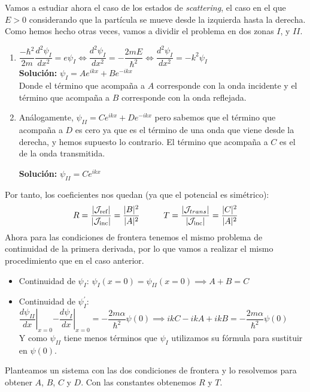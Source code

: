 \documentclass{report}
\begin{document}
            \noindent Vamos a estudiar ahora el caso de los estados de \textit{scattering},
            el caso en el que $E>0$ considerando que la partícula se mueve desde la 
            izquierda hasta la derecha. Como hemos hecho otras veces, vamos a dividir el
            problema en dos zonas $I$, y $II$.
            \begin{enumerate}
              \item $\dfrac{-\hbar^2}{2m}\dfrac{d^2\psi_I}{dx^2}=e\psi_I\Leftrightarrow 
                    \dfrac{d^2\psi_I}{dx^2}=-\dfrac{2mE}{\hbar^2}\Longleftrightarrow
                    \dfrac{d^2\psi_I}{dx^2}=-k^2\psi_I$\\

                    \textbf{Solución: } $\psi_I=Ae^{ikx}+Be^{-ikx}$ \\
                    Donde el término que acompaña a $A$ corresponde con la onda 
                    incidente y el término que acompaña a $B$ corresponde con  la 
                    onda reflejada.

              \item Análogamente, $\psi_{II}=Ce^{ikx}+De^{-ikx}$ pero sabemos que el término
                    que acompaña a $D$ es cero ya que es el término de una onda que viene
                    desde la derecha, y hemos supuesto lo contrario. El término que acompaña
                    a $C$ es el de la onda transmitida.

                    \textbf{Solución: }$\psi_{II}=Ce^{ikx}$
            \end{enumerate}
            Por tanto, los coeficientes nos quedan (ya que el potencial es simétrico):
            \[R=\dfrac{\lvert\mathcal{J}_{\text{ref}}\rvert}{\lvert\mathcal{J}_{\text{inc}}\rvert}=\dfrac{\lvert B\rvert^2}{\lvert A\rvert^2}
            \hspace{1cm}T=\dfrac{\lvert\mathcal{J}_{trans}\rvert}{\lvert\mathcal{J}_{\text{inc}}\rvert}=\dfrac{\lvert C\rvert^2}{\lvert A\rvert^2}\]
            Ahora para las condiciones de frontera tenemos el mismo problema de continuidad de la 
            primera derivada, por lo que vamos a realizar el mismo procedimiento que en el caso 
            anterior.
            \begin{itemize}
              \item Continuidad de $\psi_I$: $\psi_I(x=0)=\psi_{II}(x=0)\implies A+B=C$
              \item Continuidad de $\psi^\prime_I$: $\left.\dfrac{d\psi_{II}}{dx}\right|_{x=0}
                    \left.-\dfrac{d\psi_I}{dx}\right|_{x=0}=-\dfrac{2m\alpha}{\hbar^2}\psi(0)
                    \implies ikC-ikA+ikB=-\dfrac{2m\alpha}{\hbar^2}\psi(0)$\\

                    Y como $\psi_{II}$ tiene menos términos que $\psi_I$ utilizamos su fórmula
                    para sustituir en $\psi(0)$.
            \end{itemize}
            Planteamos un sistema con las dos condiciones de frontera y lo resolvemos para obtener
            $A$, $B$, $C$ y $D$. Con las constantes obtenemos $R$ y $T$.\\
\end{document}
